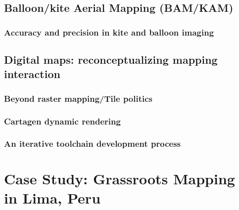 \documentclass[11pt]{report}
\begin{document}
\section{Balloon/kite Aerial Mapping (BAM/KAM)}
\subsection{Accuracy and precision in kite and balloon imaging}

\section{Digital maps: reconceptualizing mapping interaction}
\subsection{Beyond raster mapping/Tile politics}
\subsection{Cartagen dynamic rendering}
\subsection{An iterative toolchain development process}

\chapter{Case Study: Grassroots Mapping in Lima, Peru}
\end{document}
